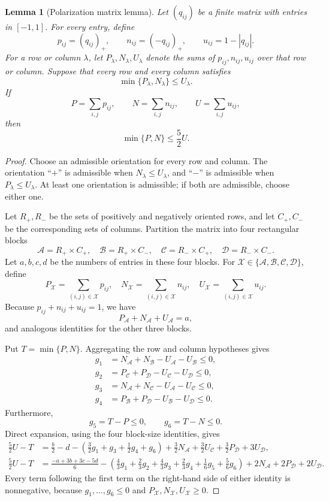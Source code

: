 \documentclass[11pt]{article}
\newtheorem{lemma}[theorem]{Lemma}
\begin{document}
\begin{lemma}[Polarization matrix lemma]
Let $(q_{ij})$ be a finite matrix with entries in $[-1,1]$.  For every entry,
define
\[
 p_{ij}=(q_{ij})_+,
 \qquad
 n_{ij}=(-q_{ij})_+,
 \qquad
 u_{ij}=1-|q_{ij}|.
\]
For a row or column $\lambda$, let $P_\lambda,N_\lambda,U_\lambda$ denote
the sums of $p_{ij},n_{ij},u_{ij}$ over that row or column.  Suppose that
every row and every column satisfies
\[
  \min\{P_\lambda,N_\lambda\}\le U_\lambda.
\]
If
\[
 P=\sum_{i,j}p_{ij},
 \qquad
 N=\sum_{i,j}n_{ij},
 \qquad
 U=\sum_{i,j}u_{ij},
\]
then
\[
  \min\{P,N\}\le\frac52U.
\]
\end{lemma}

\begin{proof}
Choose an admissible orientation for every row and column.  The orientation
``$+$'' is admissible when $N_\lambda\le U_\lambda$, and ``$-$'' is
admissible when $P_\lambda\le U_\lambda$.  At least one orientation is
admissible; if both are admissible, choose either one.

Let $R_+,R_-$ be the sets of positively and negatively oriented rows, and
let $C_+,C_-$ be the corresponding sets of columns.  Partition the matrix
into four rectangular blocks
\[
 \mathcal A=R_+\times C_+,
 \quad
 \mathcal B=R_+\times C_-,
 \quad
 \mathcal C=R_-\times C_+,
 \quad
 \mathcal D=R_-\times C_-.
\]
Let $a,b,c,d$ be the numbers of entries in these four blocks.  For
$\mathcal X\in\{\mathcal A,\mathcal B,\mathcal C,\mathcal D\}$, define
\[
 P_{\mathcal X}=\sum_{(i,j)\in\mathcal X}p_{ij},
 \quad
 N_{\mathcal X}=\sum_{(i,j)\in\mathcal X}n_{ij},
 \quad
 U_{\mathcal X}=\sum_{(i,j)\in\mathcal X}u_{ij}.
\]
Because $p_{ij}+n_{ij}+u_{ij}=1$, we have
\[
 P_{\mathcal A}+N_{\mathcal A}+U_{\mathcal A}=a,
\]
and analogous identities for the other three blocks.

Put $T=\min\{P,N\}$.  Aggregating the row and column hypotheses gives
\begin{align*}
 g_1&=N_{\mathcal A}+N_{\mathcal B}
      -U_{\mathcal A}-U_{\mathcal B}\le0,\\
 g_2&=P_{\mathcal C}+P_{\mathcal D}
      -U_{\mathcal C}-U_{\mathcal D}\le0,\\
 g_3&=N_{\mathcal A}+N_{\mathcal C}
      -U_{\mathcal A}-U_{\mathcal C}\le0,\\
 g_4&=P_{\mathcal B}+P_{\mathcal D}
      -U_{\mathcal B}-U_{\mathcal D}\le0.
\end{align*}
Furthermore,
\[
 g_5=T-P\le0,
 \qquad
 g_6=T-N\le0.
\]
Direct expansion, using the four block-size identities, gives
\begin{align}
 \frac52U-T
 &=\frac b2-d
   -\left(\frac32g_1+g_3+\frac12g_4+g_6\right)
   +\frac32N_{\mathcal A}+\frac32U_{\mathcal C}
   +\frac32P_{\mathcal D}+3U_{\mathcal D},
 \label{eq:certificate-one}\\
 \frac52U-T
 &=\frac{-a+3b+3c-5d}{6}
   -\left(\frac43g_1+\frac23g_2+\frac43g_3+\frac23g_4
          +\frac16g_5+\frac56g_6\right)
   +2N_{\mathcal A}+2P_{\mathcal D}+2U_{\mathcal D}.
 \label{eq:certificate-two}
\end{align}
Every term following the first term on the right-hand side of either
identity is nonnegative, because $g_1,\ldots,g_6\le0$ and
$P_{\mathcal X},N_{\mathcal X},U_{\mathcal X}\ge0$.


\end{proof}
\end{document}
